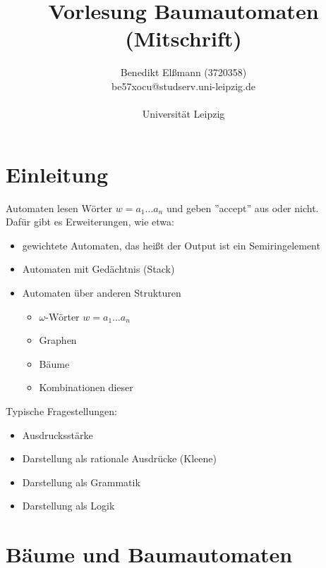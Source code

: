 \documentclass[titlepage]{article}
\begin{document}
\title{\huge{Vorlesung Baumautomaten (Mitschrift)}}
\author{Benedikt El\ss mann (3720358)\\be57xocu@studserv.uni-leipzig.de\\\\Universit\"at Leipzig}

\maketitle

\thispagestyle{empty}

\tableofcontents

\newpage

\section{Einleitung}

Automaten lesen W\"orter $ w = a_1 \dots a_n $ und geben ''accept'' aus oder nicht.\\
Daf\"ur gibt es Erweiterungen, wie etwa:

\begin{itemize}
	\item gewichtete Automaten, das hei\ss t der Output ist ein Semiringelement
	\item Automaten mit Ged\"achtnis (Stack)
	\item Automaten \"uber anderen  Strukturen

	\begin{itemize}
		\item $\omega$-W\"orter $ w = a_1 \dots a_n $ 
		\item Graphen
		\item B\"aume\\
		\item Kombinationen dieser
	\end{itemize}

\end{itemize}

Typische Fragestellungen:

\begin{itemize}
	\item Ausdrucksst\"arke
	\item Darstellung als rationale Ausdr\"ucke (Kleene)
	\item Darstellung als Grammatik
	\item Darstellung als Logik
\end{itemize}

\section{B\"aume und Baumautomaten}
\end{document}
